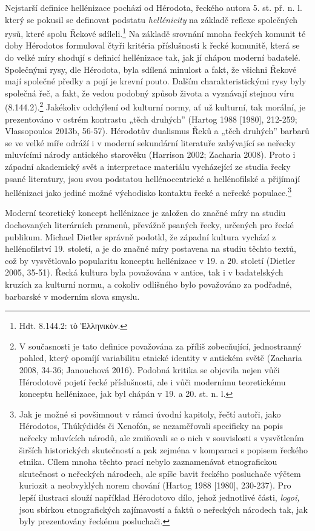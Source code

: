 Nejstarší definice hellénizace pochází od Hérodota, řeckého autora 5. st. př. n. l. který se pokusil se definovat podstatu {\em hellénicity} na základě reflexe společných rysů, které spolu Řekové sdíleli.\footnote{Hdt. 8.144.2: τὸ Ἑλληνικὸν.} Na základě srovnání mnoha řeckých komunit té doby Hérodotos formuloval čtyři kritéria příslušnosti k řecké komunitě, která se do velké míry shodují s definicí hellénizace tak, jak jí chápou moderní badatelé. Společnými rysy, dle Hérodota, byla sdílená minulost a fakt, že všichni Řekové mají společné předky a pojí je krevní pouto. Dalším charakteristickými rysy byly společná řeč, a fakt, že vedou podobný způsob života a vyznávají stejnou víru (8.144.2).\footnote{V současnosti je tato definice považována za příliš zobecňující, jednostranný pohled, který opomíjí variabilitu etnické identity v antickém světě (Zacharia 2008, 34-36; Janouchová 2016). Podobná kritika se objevila nejen vůči Hérodotově pojetí řecké příslušnosti, ale i vůči modernímu teoretickému konceptu hellénizace, jak byl chápán v 19. a 20. st. n. l.} Jakékoliv odchýlení od kulturní normy, ať už kulturní, tak morální, je prezentováno v ostrém kontrastu „těch druhých” (Hartog 1988 {[}1980{]}, 212-259; Vlassopoulos 2013b, 56-57). Hérodotův dualismus Řeků a „těch druhých” barbarů se ve velké míře odráží i v moderní sekundární literatuře zabývající se neřecky mluvícími národy antického starověku (Harrison 2002; Zacharia 2008). Proto i západní akademický svět a interpretace materiálu vycházející ze studia řecky psané literatury, jsou svou podstatou hellénocentrické a hellénofilské a přijímají hellénizaci jako jediné možné východisko kontaktu řecké a neřecké populace.\footnote{Jak je možné si povšimnout v rámci úvodní kapitoly, řečtí autoři, jako Hérodotos, Thúkýdidés či Xenofón, se nezaměřovali specificky na popis neřecky mluvících národů, ale zmiňovali se o nich v souvislosti s vysvětlením širších historických skutečností a pak zejména v komparaci s popisem řeckého etnika. Cílem mnoha těchto prací nebylo zaznamenávat etnografickou skutečnost o neřeckých národech, ale spíše bavit řeckého posluchače výčtem kuriozit a neobvyklých norem chování (Hartog 1988 {[}1980{]}, 230-237). Pro lepší ilustraci slouží například Hérodotovo dílo, jehož jednotlivé části, {\em logoi,} jsou sbírkou etnografických zajímavostí a faktů o neřeckých národech tak, jak byly prezentovány řeckému posluchači.}

Moderní teoretický koncept hellénizace je založen do značné míry na studiu dochovaných literárních pramenů, převážně psaných řecky, určených pro řecké publikum. Michael Dietler správně podotkl, že západní kultura vychází z hellénofilství 19. století, a je do značné míry postavena na studiu těchto textů, což by vysvětlovalo popularitu konceptu hellénizace v 19. a 20. století (Dietler 2005, 35-51). Řecká kultura byla považována v antice, tak i v badatelských kruzích za kulturní normu, a cokoliv odlišného bylo považováno za podřadné, barbarské v moderním slova smyslu.

